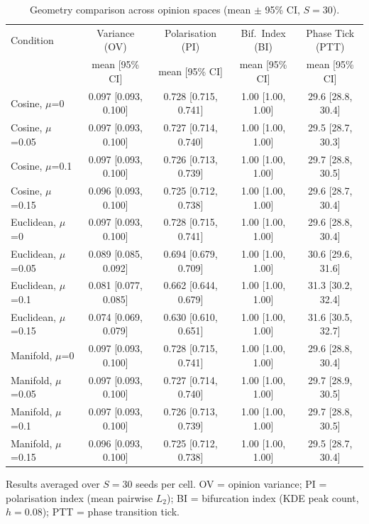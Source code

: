 \begin{table}[t]
  \centering
  \caption{Geometry comparison across opinion spaces (mean $\pm$ 95\% CI, $S=30$).}
  \label{tab:geometry}
  \begin{tabular}{lcccc}
    \toprule
    Condition & Variance (OV) & Polarisation (PI) & Bif.\ Index (BI) & Phase Tick (PTT) \\
    & mean [95\% CI] & mean [95\% CI] & mean [95\% CI] & mean [95\% CI] \\
    \midrule
    Cosine, $\mu$=0 & 0.097 [0.093, 0.100] & 0.728 [0.715, 0.741] & 1.00 [1.00, 1.00] & 29.6 [28.8, 30.4] \\
    Cosine, $\mu$=0.05 & 0.097 [0.093, 0.100] & 0.727 [0.714, 0.740] & 1.00 [1.00, 1.00] & 29.5 [28.7, 30.3] \\
    Cosine, $\mu$=0.1 & 0.097 [0.093, 0.100] & 0.726 [0.713, 0.739] & 1.00 [1.00, 1.00] & 29.7 [28.8, 30.5] \\
    Cosine, $\mu$=0.15 & 0.096 [0.093, 0.100] & 0.725 [0.712, 0.738] & 1.00 [1.00, 1.00] & 29.6 [28.7, 30.4] \\
    \midrule
    Euclidean, $\mu$=0 & 0.097 [0.093, 0.100] & 0.728 [0.715, 0.741] & 1.00 [1.00, 1.00] & 29.6 [28.8, 30.4] \\
    Euclidean, $\mu$=0.05 & 0.089 [0.085, 0.092] & 0.694 [0.679, 0.709] & 1.00 [1.00, 1.00] & 30.6 [29.6, 31.6] \\
    Euclidean, $\mu$=0.1 & 0.081 [0.077, 0.085] & 0.662 [0.644, 0.679] & 1.00 [1.00, 1.00] & 31.3 [30.2, 32.4] \\
    Euclidean, $\mu$=0.15 & 0.074 [0.069, 0.079] & 0.630 [0.610, 0.651] & 1.00 [1.00, 1.00] & 31.6 [30.5, 32.7] \\
    \midrule
    Manifold, $\mu$=0 & 0.097 [0.093, 0.100] & 0.728 [0.715, 0.741] & 1.00 [1.00, 1.00] & 29.6 [28.8, 30.4] \\
    Manifold, $\mu$=0.05 & 0.097 [0.093, 0.100] & 0.727 [0.714, 0.740] & 1.00 [1.00, 1.00] & 29.7 [28.9, 30.5] \\
    Manifold, $\mu$=0.1 & 0.097 [0.093, 0.100] & 0.726 [0.713, 0.739] & 1.00 [1.00, 1.00] & 29.7 [28.8, 30.5] \\
    Manifold, $\mu$=0.15 & 0.096 [0.093, 0.100] & 0.725 [0.712, 0.738] & 1.00 [1.00, 1.00] & 29.5 [28.7, 30.4] \\
    \bottomrule
  \end{tabular}
  \begin{minipage}{\linewidth}
    \vspace{4pt}
    \footnotesize Results averaged over $S=30$ seeds per cell. OV = opinion variance; PI = polarisation index (mean pairwise $L_2$); BI = bifurcation index (KDE peak count, $h=0.08$); PTT = phase transition tick.
  \end{minipage}
\end{table}